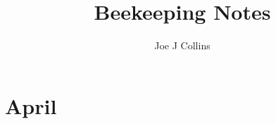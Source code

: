 \documentclass{book}
\title{Beekeeping Notes}
\author{Joe J Collins}
\date{ }
\begin{document}
 
\maketitle
 
\section{April}
 
\end{document}
